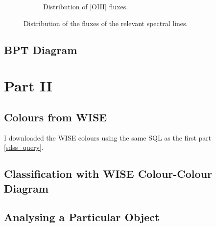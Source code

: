 \documentclass[letterpaper, oneside]{article}
\begin{document}
\begin{figure}[]
\begin{subfigure}[b]{0.475\textwidth}
		\caption[]{Distribution of [OIII] fluxes.}
		\label{fig:distr_oiii}
	\end{subfigure}
	\caption{Distribution of the fluxes of the relevant spectral lines.} 
	\label{fig:flux_distributions}
\end{figure}

\subsection{BPT Diagram}\label{bpt_diagram_section}


\section{Part II}

\subsection{Colours from WISE}

I downloaded the WISE colours using the same SQL as the first part \ref{sdss_query}.

\subsection{Classification with WISE Colour-Colour Diagram}



\subsection{Analysing a Particular Object}






\end{document}
